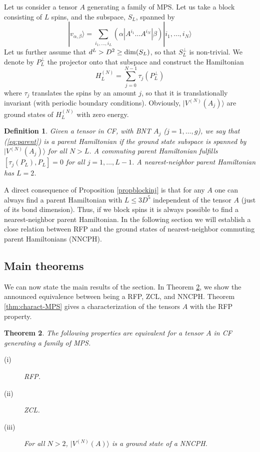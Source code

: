 \documentclass{elsarticle}
\newcommand{\be}{\begin{equation}}
\newcommand{\ee}{\end{equation}}
\newtheorem{thm}{Theorem}[section]
\newtheorem{defn}[thm]{Definition}
\begin{document}
Let us consider a tensor $A$ generating a family of MPS. Let us take a block consisting of $L$ spins, and the subspace, $S_L$, spanned by
 \be
 |v_{\alpha,\beta}\rangle = \sum_{i_1,\ldots,i_L} (\alpha|A^{i_1}\ldots A^{i_N}|\beta) |i_1,\ldots,i_N\rangle
 \ee
Let us further assume that $d^L>D^2\ge {\rm dim}(S_L)$, so that $S_L^\perp$ is non-trivial. We denote by $P_L^\perp$ the projector onto that subspace and construct the Hamiltonian
 \be
 \label{eq:parent}
 H_{L}^{(N)} = \sum_{j=0}^{N-1} \tau_j(P_L^\perp)
 \ee
where $\tau_j$ translates the spins by an amount $j$, so that it is translationally invariant (with periodic boundary conditions). Obviously, $|V^{(N)}(A_j)\rangle$ are ground states of $H_L^{(N)}$ with zero energy.

\begin{defn}
Given a tensor in CF, with BNT $A_j$ ($j=1,\ldots,g$), we say that
(\ref{eq:parent}) is a parent Hamiltonian if the ground state subspace is spanned by $|V^{(N)}(A_j)\rangle$ for all $N>L$.  A commuting parent Hamiltonian fulfills $[\tau_j(P_L),P_L]=0$ for all $j=1,\ldots,L-1$. A nearest-neighbor parent Hamiltonian has $L=2$.
\end{defn}

A direct consequence of Proposition \ref{propblockinj} \cite{David2006} is that for any $A$ one can always find a parent Hamiltonian with $L\le 3D^5$ independent of the tensor $A$ (just of its bond dimension). Thus, if we block spins it is always possible to find a nearest-neighbor parent Hamiltonian. In the following section we will establish a close relation between RFP and the ground states of nearest-neighbor commuting parent Hamiltonians (NNCPH).

\subsection{Main theorems}

We can now state the main results of the section. In Theorem \ref{thm:main-MPS}, we show the announced equivalence between being a RFP,  ZCL, and NNCPH. Theorem \ref{thm:charact-MPS} gives a characterization of the tensors $A$ with the RFP property.

\begin{thm}\label{thm:main-MPS}
The following properties are equivalent for a tensor $A$ in CF generating a family of  MPS.
\begin{description}
\item[(i)] RFP.
\item[(ii)] ZCL.
\item[(iii)] For all $N>2$, $|V^{(N)} (A)\rangle$ is a ground state of a NNCPH.
\end{description}
\end{thm}
\end{document}
